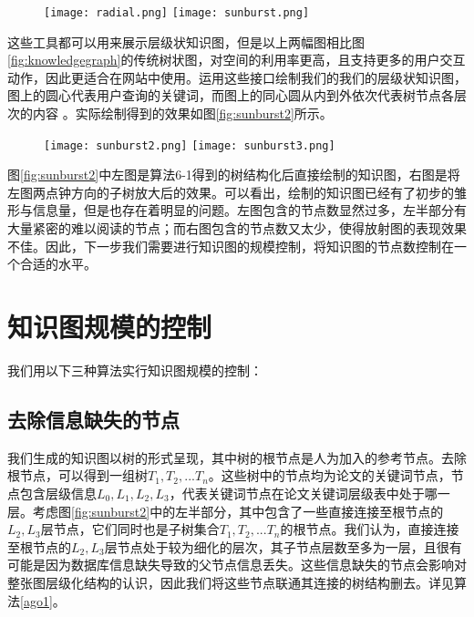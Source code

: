 \begin{figure}[!htp]
  \centering
  \texttt{[image: radial.png]}
  \hspace{1cm}
  \texttt{[image: sunburst.png]}
\end{figure}

这些工具都可以用来展示层级状知识图，但是以上两幅图相比图\ref{fig:knowledgegraph}的传统树状图，对空间的利用率更高，且支持更多的用户交互动作，因此更适合在网站中使用。运用这些接口绘制我们的我们的层级状知识图，图上的圆心代表用户查询的关键词，而图上的同心圆从内到外依次代表树节点各层次的内容 。实际绘制得到的效果如图\ref{fig:sunburst2}所示。

\begin{figure}[!htp]
  \centering
  \texttt{[image: sunburst2.png]}
  \hspace{1cm}
  \texttt{[image: sunburst3.png]}
\end{figure}

图\ref{fig:sunburst2}中左图是算法6-1得到的树结构化后直接绘制的知识图，右图是将左图两点钟方向的子树放大后的效果。可以看出，绘制的知识图已经有了初步的雏形与信息量，但是也存在着明显的问题。左图包含的节点数显然过多，左半部分有大量紧密的难以阅读的节点；而右图包含的节点数又太少，使得放射图的表现效果不佳。因此，下一步我们需要进行知识图的规模控制，将知识图的节点数控制在一个合适的水平。

\section{知识图规模的控制}
我们用以下三种算法实行知识图规模的控制：
\subsection{去除信息缺失的节点}
我们生成的知识图以树的形式呈现，其中树的根节点是人为加入的参考节点。去除根节点，可以得到一组树${T_1,T_2,...T_n}$。这些树中的节点均为论文的关键词节点，节点包含层级信息${L_0,L_1,L_2,L_3}$，代表关键词节点在论文关键词层级表中处于哪一层。考虑图\ref{fig:sunburst2}中的左半部分，其中包含了一些直接连接至根节点的$L_2,L_3$层节点，它们同时也是子树集合${T_1,T_2,...T_n}$的根节点。我们认为，直接连接至根节点的$L_2,L_3$层节点处于较为细化的层次，其子节点层数至多为一层，且很有可能是因为数据库信息缺失导致的父节点信息丢失。这些信息缺失的节点会影响对整张图层级化结构的认识，因此我们将这些节点联通其连接的树结构删去。详见算法\ref{ago1}。


